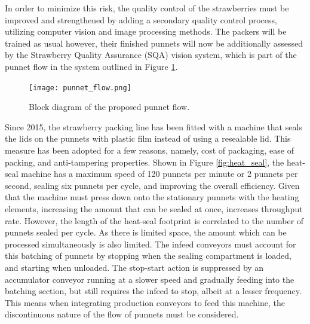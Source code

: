 \documentclass[fleqn,twoside,12pt]{report}
\begin{document}
In order to minimize this risk, the quality control of the strawberries must be improved and strengthened by adding a secondary quality control process, utilizing computer vision and image processing methods. The packers will be trained as usual however, their finished punnets will now be additionally assessed by the Strawberry Quality Assurance (SQA) vision system, which is part of the punnet flow in the system outlined in Figure \ref{fig:punnet_flow}. 

\begin{figure}[h]
	\centering
	\texttt{[image: punnet\_flow.png]}
	\caption{Block diagram of the proposed punnet flow.}
	\label{fig:punnet_flow}
\end{figure}

Since 2015, the strawberry packing line has been fitted with a machine that seals the lids on the punnets with plastic film instead of using a resealable lid. This measure has been adopted for a few reasons, namely, cost of packaging, ease of packing, and anti-tampering properties. Shown in Figure \ref{fig:heat_seal}, the heat-seal machine has a maximum speed of 120 punnets per minute or 2 punnets per second, sealing six punnets per cycle, and improving the overall efficiency. Given that the machine must press down onto the stationary punnets with the heating elements, increasing the amount that can be sealed at once, increases throughput rate. However, the length of the heat-seal footprint is correlated to the number of punnets sealed per cycle. As there is limited space, the amount which can be processed simultaneously is also limited. The infeed conveyors must account for this batching of punnets by stopping when the sealing compartment is loaded, and starting when unloaded. The stop-start action is suppressed by an accumulator conveyor running at a slower speed and gradually feeding into the batching section, but still requires the infeed to stop, albeit at a lesser frequency. This means when integrating production conveyors to feed this machine, the discontinuous nature of the flow of punnets must be considered.
\end{document}
